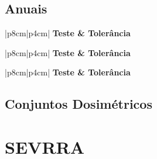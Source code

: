 \clearpage
\subsection{Anuais}

\begin{table}[h]
    \centering
    \begin{NiceTabular}{|p{8cm}|p{4cm}|}\hline%
        \color{white}\bfseries Teste & \color{white}\bfseries Tolerância \\\hline\hline
        \hline
    \end{NiceTabular}
    \caption{Testes anuais de segurança.}
    \label{tab:testes_anuais_seguranca}
\end{table}

\begin{table}[h]
    \centering
    \begin{NiceTabular}{|p{8cm}|p{4cm}|}\hline%
        \color{white}\bfseries Teste & \color{white}\bfseries Tolerância \\\hline\hline
        \hline
    \end{NiceTabular}
    \caption{Testes anuais dosimétricos.}
    \label{tab:testes_anuais_dosimetricos}
\end{table}

\begin{table}[h]
    \centering
    \begin{NiceTabular}{|p{8cm}|p{4cm}|}\hline%
        \color{white}\bfseries Teste & \color{white}\bfseries Tolerância \\\hline\hline
        \hline
    \end{NiceTabular}
    \caption{Testes anuais mecânicos.}
    \label{tab:testes_anuais_mecanicos}
\end{table}

\clearpage
\subsection{Conjuntos Dosimétricos}
\label{sec:conjuntos_dosimtricos}

\clearpage
\section{SEVRRA}
\label{sec:sevrra}

